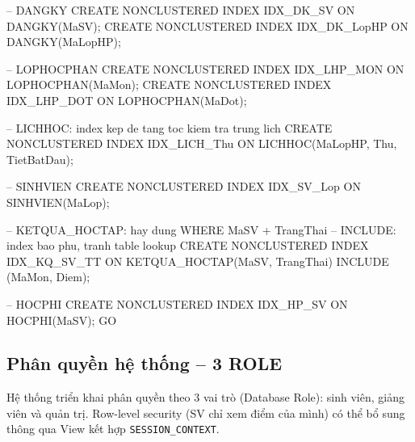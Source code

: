 \documentclass[13pt, a4paper]{article}
\begin{document}
\begin{sqlbox}
-- DANGKY
CREATE NONCLUSTERED INDEX IDX_DK_SV    ON DANGKY(MaSV);
CREATE NONCLUSTERED INDEX IDX_DK_LopHP ON DANGKY(MaLopHP);

-- LOPHOCPHAN
CREATE NONCLUSTERED INDEX IDX_LHP_MON  ON LOPHOCPHAN(MaMon);
CREATE NONCLUSTERED INDEX IDX_LHP_DOT  ON LOPHOCPHAN(MaDot);

-- LICHHOC: index kep de tang toc kiem tra trung lich
CREATE NONCLUSTERED INDEX IDX_LICH_Thu ON LICHHOC(MaLopHP, Thu, TietBatDau);

-- SINHVIEN
CREATE NONCLUSTERED INDEX IDX_SV_Lop   ON SINHVIEN(MaLop);

-- KETQUA_HOCTAP: hay dung WHERE MaSV + TrangThai
-- INCLUDE: index bao phu, tranh table lookup
CREATE NONCLUSTERED INDEX IDX_KQ_SV_TT
    ON KETQUA_HOCTAP(MaSV, TrangThai) INCLUDE (MaMon, Diem);

-- HOCPHI
CREATE NONCLUSTERED INDEX IDX_HP_SV    ON HOCPHI(MaSV);
GO
\end{sqlbox}

\subsection{Phân quyền hệ thống -- 3 ROLE}

\noindent Hệ thống triển khai phân quyền theo 3 vai trò (Database Role): sinh viên, giảng viên và quản trị. Row-level security (SV chỉ xem điểm của mình) có thể bổ sung thông qua View kết hợp \texttt{SESSION\_CONTEXT}.
\end{document}
